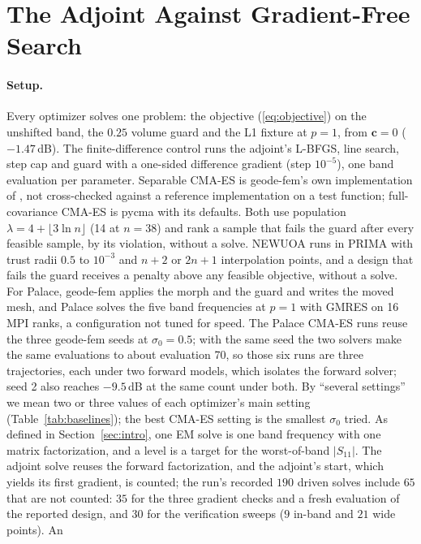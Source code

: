 \documentclass{anvil-paper}
\begin{document}
\section{The Adjoint Against Gradient-Free Search}
\label{sec:baselines}

\paragraph{Setup.}
Every optimizer solves one problem: the objective (\ref{eq:objective}) on
the unshifted band, the $0.25$ volume guard and the L1 fixture at $p = 1$,
from $\mathbf{c} = 0$ ($-1.47$\,dB). The finite-difference control runs the
adjoint's L-BFGS, line search, step cap and guard with a one-sided
difference gradient (step $10^{-5}$), one band evaluation per parameter.
Separable CMA-ES is geode-fem's own implementation of
\citet{ros2008separable}, not cross-checked against a reference
implementation on a test function; full-covariance CMA-ES is pycma
\citep{pycma} with its defaults. Both use population
$\lambda = 4 + \lfloor 3\ln n\rfloor$ (14 at $n = 38$) and rank a sample
that fails the guard after every feasible sample, by its violation, without
a solve. NEWUOA runs in PRIMA with trust radii $0.5$ to $10^{-3}$ and $n + 2$
or $2n + 1$ interpolation points, and a design that fails the guard receives
a penalty above any feasible objective, without a solve. For Palace,
geode-fem applies the morph and the guard and writes the moved mesh, and
Palace solves the five band frequencies at $p = 1$ with GMRES on 16 MPI
ranks, a configuration not tuned for speed. The Palace CMA-ES runs reuse the
three geode-fem seeds at $\sigma_0 = 0.5$; with the same seed the two solvers
make the same evaluations to about evaluation 70, so those six runs are
three trajectories, each under two forward models, which isolates the
forward solver; seed 2 also reaches $-9.5$\,dB at the same count under both.
By ``several settings'' we mean two or three values of each optimizer's
main setting (Table~\ref{tab:baselines}); the best CMA-ES setting is the
smallest $\sigma_0$ tried. As defined in Section~\ref{sec:intro}, one EM solve is one band frequency with one
matrix factorization, and a level is a target for the worst-of-band $|S_{11}|$. The adjoint
solve reuses the forward factorization, and the adjoint's start, which
yields its first gradient, is counted; the run's recorded $190$ driven
solves include $65$ that are not counted: $35$ for the three gradient checks
and a fresh evaluation of the reported design, and $30$ for the verification
sweeps ($9$ in-band and $21$ wide points). An
\end{document}

